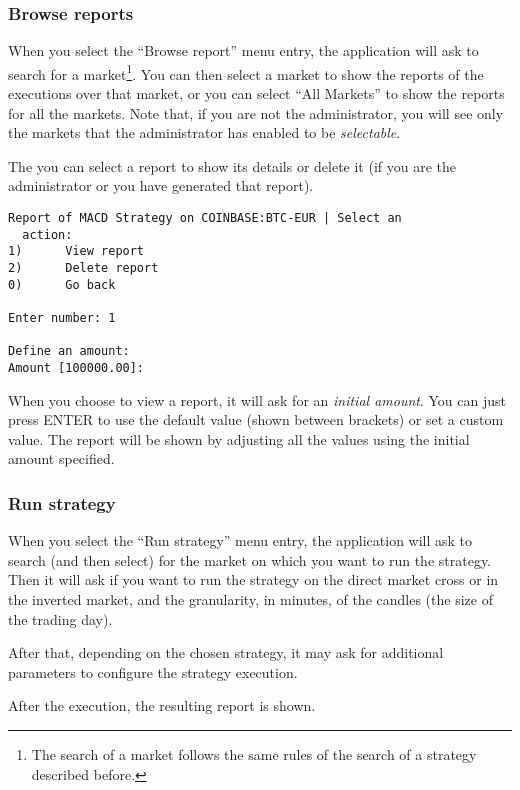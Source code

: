 \subsubsection{Browse reports}

When you select the ``Browse report'' menu entry, the application will ask to
search for a market\footnote{The search of a market follows the same rules of
the search of a strategy described before.}. You can then select a market to
show the reports of the executions over that market, or you can select ``All
Markets'' to show the reports for all the markets. Note that, if you are not the
administrator, you will see only the markets that the administrator has enabled
to be \emph{selectable}.

The you can select a report to show its details or delete it (if you are the
administrator or you have generated that report).

\begin{verbatim}
Report of MACD Strategy on COINBASE:BTC-EUR | Select an
  action:
1)      View report
2)      Delete report
0)      Go back

Enter number: 1

Define an amount:
Amount [100000.00]:
\end{verbatim}

When you choose to view a report, it will ask for an \emph{initial amount}. You
can just press ENTER to use the default value (shown between brackets) or set a
custom value. The report will be shown by adjusting all the values using the
initial amount specified.

\subsubsection{Run strategy}

When you select the ``Run strategy'' menu entry, the application will ask to
search (and then select) for the market on which you want to run the strategy.
Then it will ask if you want to run the strategy on the direct market cross or
in the inverted market, and the granularity, in minutes, of the candles (the
size of the trading day).

After that, depending on the chosen strategy, it may ask for additional
parameters to configure the strategy execution.

After the execution, the resulting report is shown.

